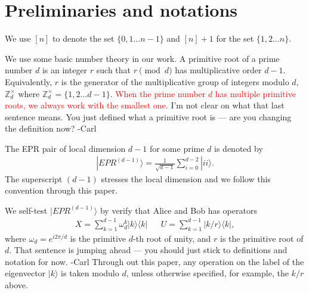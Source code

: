 \documentclass[11pt,letterpaper]{article}
\newcommand{\ket}[1]{|#1\rangle}
\newcommand{\ketbra}[2]{|#1\rangle\langle#2|}
\newcommand{\Z}{\mathbb{Z}}
\newcommand{\Zd}{\Z_d^{\times}}
\newcommand{\1}{\mathbb{1}}
\newcommand{\EPR}[1]{EPR^{(#1)}}
\def\carl#1{{\color{blue} #1 -Carl}}
\theoremstyle{definition}
\begin{document}
\section{Preliminaries and notations}
\label{sec:prelim}
We use $[n]$ to denote the set $\{0,1 \dots n-1\}$ and $[n]+1$ for the set $\{1,2 \dots n\}$.

We use some basic number theory in our work. A primitive root of a prime number
$d$ is an integer $r$ such that $r \pmod{d}$ has multiplicative order $d-1$. Equivalently,
$r$ is the generator of the multiplicative group of integers modulo $d$, $\Zd$ where
$\Zd = \{1,2\dots d-1\}$. \textcolor{red}{When the prime number $d$ has multiple primitive roots,
we always work with the smallest one.}
\carl{I'm not clear on what that last sentence means.  You just defined what a primitive root
is --- are you changing the definition now?}

The EPR pair of local dimension $d-1$ for some prime $d$ is denoted by
\begin{align}
\ket{\EPR{d-1}} = \frac{1}{\sqrt{d-1}} \sum_{i = 0}^{d-2} \ket{ii}.
\end{align}
The superscript $(d-1)$ stresses the local dimension and we follow this convention through this paper.

We self-test $\ket{\EPR{d-1}}$ by verify that Alice and Bob has operators
\begin{align}
	X = \sum_{k=1}^{d-1} \omega_d^k\ketbra{k}{k} && U = \sum_{k=1}^{d-1} \ketbra{k/r}{k},
\end{align}
where $\omega_d = e^{i2\pi/d}$ is the primitive $d$-th root of unity,
and $r$ is the primitive root of $d$.  \carl{That sentence is jumping ahead --- you should just stick to
definitions and notation for now.}
Through out this paper, any operation on the label of the eigenvector $\ket{k}$ is taken modulo $d$,
unless otherwise specified, for example, the $k/r$ above.
\end{document}

